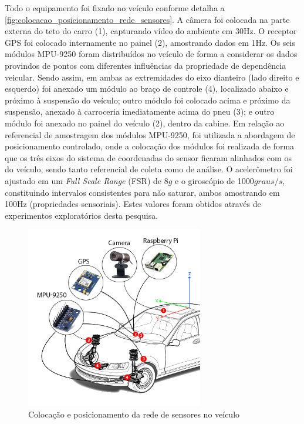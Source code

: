 Todo o equipamento foi fixado no veículo conforme detalha a \autoref{fig:colocacao_posicionamento_rede_sensores}. A câmera foi colocada na parte externa do teto do carro (1), capturando vídeo do ambiente em 30Hz. O receptor GPS foi colocado internamente no painel (2), amostrando dados em 1Hz. Os seis módulos MPU-9250 foram distribuídos no veículo de forma a considerar os dados provindos de pontos com diferentes influências da propriedade de dependência veicular. Sendo assim, em ambas as extremidades do eixo dianteiro (lado direito e esquerdo) foi anexado um módulo ao braço de controle (4), localizado abaixo e próximo à suspensão do veículo; outro módulo foi colocado acima e próximo da suspensão, anexado à carroceria imediatamente acima do pneu (3); e outro módulo foi anexado no painel do veículo (2), dentro da cabine. Em relação ao referencial de amostragem dos módulos MPU-9250, foi utilizada a abordagem de posicionamento controlado, onde a colocação dos módulos foi realizada de forma que os três eixos do sistema de coordenadas do sensor ficaram alinhados com os do veículo, sendo tanto referencial de coleta como de análise. O acelerômetro foi ajustado em um \textit{Full Scale Range} (FSR) de 8$g$ e o giroscópio de 1000$graus/s$, constituindo intervalos consistentes para não saturar, ambos amostrando em 100Hz (propriedades sensoriais). Estes valores foram obtidos através de experimentos exploratórios desta pesquisa.

\begin{figure}[h!]
  \centering
  \caption{Colocação e posicionamento da rede de sensores no veículo}
   \label{fig:colocacao_posicionamento_rede_sensores}
   \includegraphics[width=0.69\textwidth]{figuras/fig_22.png}
\end{figure}

